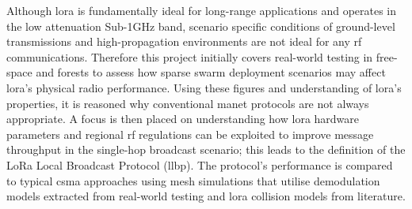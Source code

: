 Although \ac{lora} is fundamentally ideal for long-range applications and operates in the low attenuation Sub-1GHz band, scenario specific conditions of ground-level transmissions and high-propagation environments are not ideal for any \ac{rf} communications. Therefore this project initially covers real-world testing in free-space and forests to assess how sparse swarm deployment scenarios may affect \ac{lora}'s physical radio performance. Using these figures and understanding of \ac{lora}'s properties, it is reasoned why conventional \ac{manet} protocols are not always appropriate. A focus is then placed on understanding how \ac{lora} hardware parameters and regional \ac{rf} regulations can be exploited to improve message throughput in the single-hop broadcast scenario; this leads to the definition of the LoRa Local Broadcast Protocol (\ac{llbp}). The protocol's performance is compared to typical \ac{csma} approaches using mesh simulations that utilise demodulation models extracted from real-world testing and \ac{lora} collision models from literature. 


%
%
%
%

%


%

%

